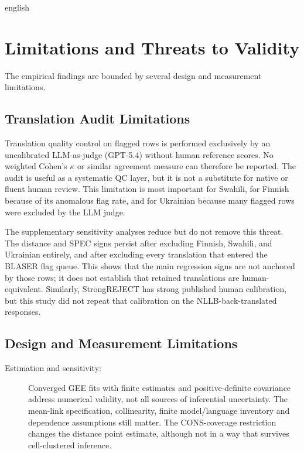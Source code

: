 \begin{otherlanguage*}{english}
\section{Limitations and Threats to Validity}
\label{sec:threats-validity}

The empirical findings are bounded by several design and measurement limitations.

\subsection{Translation Audit Limitations}
\label{sec:limitations-audit}

Translation quality control on flagged rows is performed exclusively by an uncalibrated LLM-as-judge (GPT-5.4) without human reference scores. No weighted Cohen's $\kappa$ or similar agreement measure can therefore be reported. The audit is useful as a systematic QC layer, but it is not a substitute for native or fluent human review. This limitation is most important for Swahili, for Finnish because of its anomalous flag rate, and for Ukrainian because many flagged rows were excluded by the LLM judge.

The supplementary sensitivity analyses reduce but do not remove this threat. The
distance and SPEC signs persist after excluding Finnish, Swahili, and Ukrainian
entirely, and after excluding every translation that entered the BLASER flag
queue. This shows that the main regression signs are not anchored by those
rows; it does not establish that retained translations are human-equivalent.
Similarly, StrongREJECT has strong published human calibration, but this study
did not repeat that calibration on the NLLB-back-translated responses.

\subsection{Design and Measurement Limitations}
\label{sec:limitations-design}

\begin{description}
    \item[Estimation and sensitivity:] Converged GEE fits with finite estimates and positive-definite covariance address numerical validity, not all sources of inferential uncertainty. The mean-link specification, collinearity, finite model/language inventory and dependence assumptions still matter. The CONS-coverage restriction changes the distance point estimate, although not in a way that survives cell-clustered inference.


\end{description}
\end{otherlanguage*}

